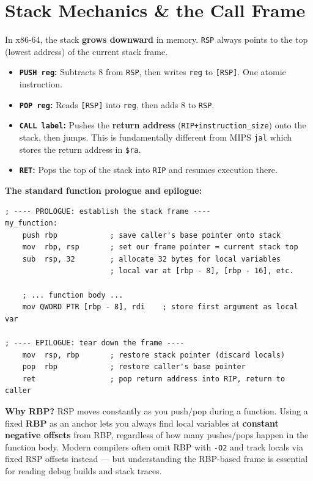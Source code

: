 \documentclass[11pt, letterpaper]{article}
\begin{document}
\section*{Stack Mechanics \& the Call Frame}

In x86-64, the stack \textbf{grows downward} in memory. \texttt{RSP} always points to the top (lowest address) of the current stack frame.

\begin{itemize}[noitemsep]
  \item \textbf{\texttt{PUSH reg}:} Subtracts 8 from \texttt{RSP}, then writes \texttt{reg} to \texttt{[RSP]}. One atomic instruction.
  \item \textbf{\texttt{POP reg}:} Reads \texttt{[RSP]} into \texttt{reg}, then adds 8 to \texttt{RSP}.
  \item \textbf{\texttt{CALL label}:} Pushes the \textbf{return address} (\texttt{RIP+instruction\_size}) onto the stack, then jumps. This is fundamentally different from MIPS \texttt{jal} which stores the return address in \texttt{\$ra}.
  \item \textbf{\texttt{RET}:} Pops the top of the stack into \texttt{RIP} and resumes execution there.
\end{itemize}

\textbf{The standard function prologue and epilogue:}

\begin{lstlisting}[style=x86, caption={Standard x86-64 function frame setup}]
; ---- PROLOGUE: establish the stack frame ----
my_function:
    push rbp            ; save caller's base pointer onto stack
    mov  rbp, rsp       ; set our frame pointer = current stack top
    sub  rsp, 32        ; allocate 32 bytes for local variables
                        ; local var at [rbp - 8], [rbp - 16], etc.

    ; ... function body ...
    mov QWORD PTR [rbp - 8], rdi    ; store first argument as local var

; ---- EPILOGUE: tear down the frame ----
    mov  rsp, rbp       ; restore stack pointer (discard locals)
    pop  rbp            ; restore caller's base pointer
    ret                 ; pop return address into RIP, return to caller
\end{lstlisting}

\begin{tcolorbox}[colback=part6bg, colframe=sectionred, arc=3pt, boxrule=1pt]
\textbf{Why RBP?} RSP moves constantly as you push/pop during a function. Using a fixed \textbf{RBP} as an anchor lets you always find local variables at \textbf{constant negative offsets} from RBP, regardless of how many pushes/pops happen in the function body. Modern compilers often omit RBP with \texttt{-O2} and track locals via fixed RSP offsets instead --- but understanding the RBP-based frame is essential for reading debug builds and stack traces.
\end{tcolorbox}
\end{document}
